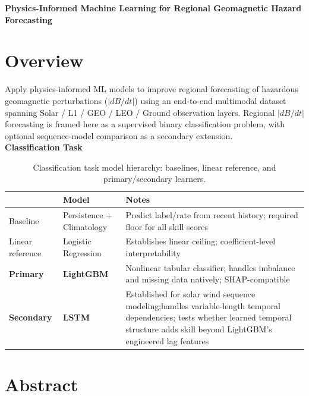 \documentclass{article}
\begin{document}
\pagestyle{fancy}


\begin{center}
\Large\textbf{Physics-Informed Machine Learning for Regional Geomagnetic Hazard Forecasting}\\
\end{center}

\section*{Overview}
Apply physics-informed ML models to improve regional forecasting of hazardous geomagnetic perturbations ($|dB/dt|$) using an end-to-end multimodal dataset spanning Solar / L1 / GEO / LEO / Ground observation layers. Regional $|dB/dt|$ forecasting is framed here as a supervised binary classification problem, with optional sequence-model comparison as a secondary extension.\\

\noindent \textbf{Classification Task}

\begin{table}[h]
\centering
\begin{tabular}{|l|l|p{8cm}|}
\hline
& \textbf{Model} & \textbf{Notes} \\ \hline
Baseline & Persistence + Climatology & Predict label/rate from recent history; required floor for all skill scores \\ \hline
Linear reference & Logistic Regression & Establishes linear ceiling; coefficient-level interpretability \\ \hline
\textbf{Primary} & \textbf{LightGBM} & Nonlinear tabular classifier; handles imbalance and missing data natively; SHAP-compatible \\ \hline
\textbf{Secondary} & \textbf{LSTM} & Established for solar wind sequence modeling;handles variable-length temporal dependencies; tests whether learned temporal structure adds skill beyond LightGBM's engineered lag features \\ \hline
\end{tabular}
\caption{Classification task model hierarchy: baselines, linear reference, and primary/secondary learners.}
\end{table}

\section*{Abstract}
\end{document}
